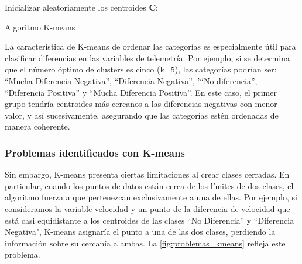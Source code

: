 \IncMargin{1em}
\begin{algorithm}[H]
\LinesNumbered
\SetAlgoLined


Inicializar aleatoriamente los centroides $\mathbf{C}$;
\caption{Algoritmo K-means}\label{alg
}
\label{alg:k-means}
\end{algorithm}
\DecMargin{1em}

La característica de K-means de ordenar las categorías es especialmente útil para clasificar diferencias en las variables de telemetría. Por ejemplo, si se determina que el número óptimo de clusters es cinco (k=5), las categorías podrían ser: ``Mucha Diferencia Negativa'', ``Diferencia Negativa'', '``No diferencia'', ``Diferencia Positiva'' y ``Mucha Diferencia Positiva''. En este caso, el primer grupo tendría centroides más cercanos a las diferencias negativas con menor valor, y así sucesivamente, asegurando que las categorías estén ordenadas de manera coherente.

\subsubsection*{Problemas identificados con K-means}
Sin embargo, K-means presenta ciertas limitaciones al crear clases cerradas. En particular, cuando los puntos de datos están cerca de los límites de dos clases, el algoritmo fuerza a que pertenezcan exclusivamente a una de ellas. Por ejemplo, si consideramos la variable velocidad y un punto de la diferencia de velocidad que está casi equidistante a los centroides de las clases ``No Diferencia'' y ``Diferencia Negativa", K-means asignaría el punto a una de las dos clases, perdiendo la información sobre su cercanía a ambas. La \autoref{fig:problemas_kmeans} refleja este problema.

